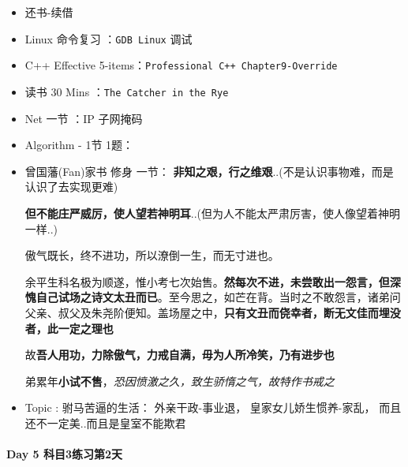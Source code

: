 \documentclass[UTF8,a4paper,8pt]{ctexart}
\begin{document}
	 	 \begin{itemize}[itemindent = 1em]
	 	 	\renewcommand\labelitemi{\makebox[0pt][l]{$\square$}\hspace{1em}} 
	 	 	\item   还书-续借
	 	 	\renewcommand\labelitemi{\makebox[0pt][l]{$\square$}\raisebox{.15ex}{\hspace{0.1em}$\checkmark$}}
	 	 	\item   Linux 命令复习 ：\verb|GDB Linux|  调试
	 	 	\item   C++ Effective 5-items：\verb|Professional C++ Chapter9-Override|
	 	 	
	 	 	\item   读书  30 Mins	：\verb|The Catcher in the Rye|	
	 	 	\renewcommand\labelitemi{\makebox[0pt][l]{$\square$}\hspace{1em}} 
	 	 	\item   Net 一节 ：IP 子网掩码	
	 	 	\item   Algorithm - 1节 1题：
	 	 	
	 	 	\renewcommand\labelitemi{\makebox[0pt][l]{$\square$}\raisebox{.15ex}{\hspace{0.1em}$\checkmark$}}
	 	 	\item  曾国藩(Fan)家书 修身 一节： \textbf{非知之艰，行之维艰}..(不是认识事物难，而是认识了去实现更难)
	 	 	
	 	 	\textbf{但不能庄严威厉，使人望若神明耳}..(但为人不能太严肃厉害，使人像望着神明一样..)
	 	 	
	 	 	傲气既长，终不进功，所以潦倒一生，而无寸进也。
	 	 	
	 	 	余平生科名极为顺遂，惟小考七次始售。\textbf{然每次不进，未尝敢出一怨言，但深愧自己试场之诗文太丑而已}。至今思之，如芒在背。当时之不敢怨言，诸弟问父亲、叔父及朱尧阶便知。盖场屋之中，\textbf{只有文丑而侥幸者，断无文佳而埋没者，此一定之理也}
	 	 	
	 	 	故\textbf{吾人用功，力除傲气，力戒自满，毋为人所冷笑，乃有进步也}
	 	 	
	 	 	弟累年\textbf{小试不售}，\textit{恐因愤激之久，致生骄惰之气，故特作书戒之}
	 	 	\item   Topic : 驸马苦逼的生活： 外亲干政-事业退， 皇家女儿娇生惯养-家乱， 而且还不一定美..而且是皇室不能欺君
	 	 \end{itemize}
 	 \paragraph{Day 5  科目3练习第2天    \quad     }
	 	 
\end{document}
